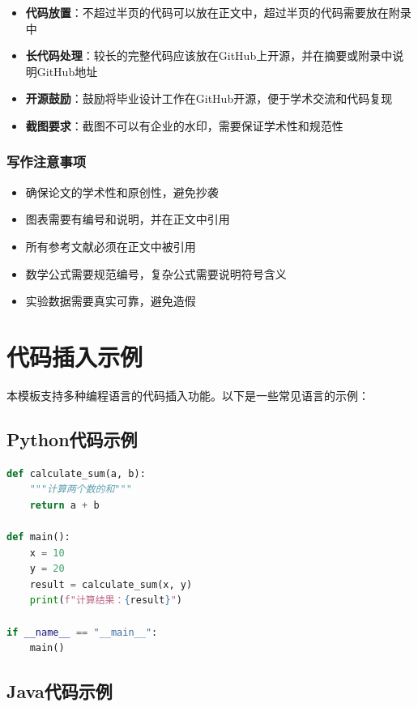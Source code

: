 \documentclass
  [
    math-font    = STIX Two Math, agreed,
    CJKmain-font = { {Songti SC}[AutoFakeBold = 2.5, AutoFakeSlant] },
    CJKsans-font = { {STHeiti}[AutoFakeBold = 2] }
  ] {hduthesis}
\begin{document}
\begin{itemize}
\item \textbf{代码放置}：不超过半页的代码可以放在正文中，超过半页的代码需要放在附录中
\item \textbf{长代码处理}：较长的完整代码应该放在GitHub上开源，并在摘要或附录中说明GitHub地址
\item \textbf{开源鼓励}：鼓励将毕业设计工作在GitHub开源，便于学术交流和代码复现
\item \textbf{截图要求}：截图不可以有企业的水印，需要保证学术性和规范性
\end{itemize}

\subsection{写作注意事项}

\begin{itemize}
\item 确保论文的学术性和原创性，避免抄袭
\item 图表需要有编号和说明，并在正文中引用
\item 所有参考文献必须在正文中被引用
\item 数学公式需要规范编号，复杂公式需要说明符号含义
\item 实验数据需要真实可靠，避免造假
\end{itemize}

\chapter{代码插入示例}

本模板支持多种编程语言的代码插入功能。以下是一些常见语言的示例：

\section{Python代码示例}

\begin{lstlisting}[language=Python, caption={Python示例：基本函数定义}]
def calculate_sum(a, b):
    """计算两个数的和"""
    return a + b

def main():
    x = 10
    y = 20
    result = calculate_sum(x, y)
    print(f"计算结果：{result}")

if __name__ == "__main__":
    main()
\end{lstlisting}

\section{Java代码示例}
\end{document}
